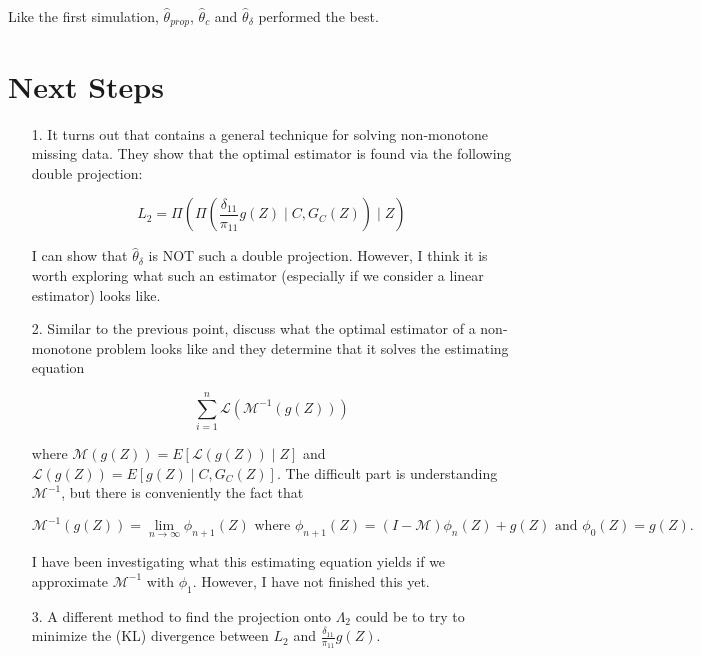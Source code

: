 \documentclass[12pt]{article}
\begin{document}
Like the first simulation, $\hat \theta_{prop}$, $\hat \theta_c$
and $\hat \theta_{\delta}$ performed the best.

\section*{Next Steps}

\begin{itemize}
  \item[1.] It turns out that \cite{tsiatis2006semiparametric} contains 
    a general technique for solving non-monotone missing data. They show 
    that the optimal estimator is found via the following double projection:

    \[L_2 = \Pi\left(\Pi\left(\frac{\delta_{11}}{\pi_{11}}g(Z) \mid C,
    G_C(Z)\right) \mid Z\right)\]

    I can show that $\hat \theta_\delta$ is NOT such a double projection. 
    However, I think it is worth exploring what such an estimator (especially 
    if we consider a linear estimator) looks like.
  \item[2.] Similar to the previous point, \cite{tsiatis2006semiparametric} 
    discuss what the optimal estimator of a non-monotone problem looks like 
    and they determine that it solves the estimating equation

    \[\sum_{i = 1}^n \mathcal{L}(\mathcal{M}^{-1}(g(Z)))\]

    where $\mathcal{M}(g(Z)) = E[\mathcal{L}(g(Z)) \mid Z]$ and 
    $\mathcal{L}(g(Z)) = E[g(Z) \mid C, G_C(Z)]$. The difficult part is 
    understanding $\mathcal{M}^{-1}$, but there is conveniently the fact that

    \[\mathcal{M}^{-1}(g(Z)) = \lim_{n \to \infty} \phi_{n + 1}(Z) \text{ where } 
      \phi_{n + 1}(Z) = (I - \mathcal{M}) \phi_n(Z) + g(Z) \text{ and }
    \phi_0(Z) = g(Z).\]

    I have been investigating what this estimating equation yields if we 
    approximate $\mathcal{M}^{-1}$ with $\phi_1$. However, I have not 
    finished this yet.
  \item[3.] A different method to find the projection onto $\Lambda_2$ 
    could be to try to minimize the (KL) divergence between 
    $L_2$ and $\frac{\delta_{11}}{\pi_{11}}g(Z)$.
\end{itemize}

\newpage 

\printbibliography

\newpage
\end{document}
